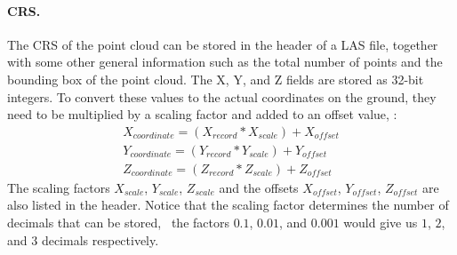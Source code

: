 \paragraph{CRS.}
The CRS of the point cloud can be stored in the header of a LAS file, together with some other general information such as the total number of points and the bounding box of the point cloud. 
The X, Y, and Z fields are stored as 32-bit integers. 
To convert these values to the actual coordinates on the ground, they need to be multiplied by a scaling factor and added to an offset value, \ie:
\begin{gather*}
  X_{coordinate} = (X_{record} * X_{scale}) + X_{offset} \\
  Y_{coordinate} = (Y_{record} * Y_{scale}) + Y_{offset} \\
  Z_{coordinate} = (Z_{record} * Z_{scale}) + Z_{offset}
\end{gather*}
The scaling factors $X_{scale}$, $Y_{scale}$, $Z_{scale}$ and the offsets $X_{offset}$, $Y_{offset}$, $Z_{offset}$ are also listed in the header. 
Notice that the scaling factor determines the number of decimals that can be stored, \eg\ the factors $0.1$, $0.01$, and $0.001$ would give us $1$, $2$, and $3$ decimals respectively.

